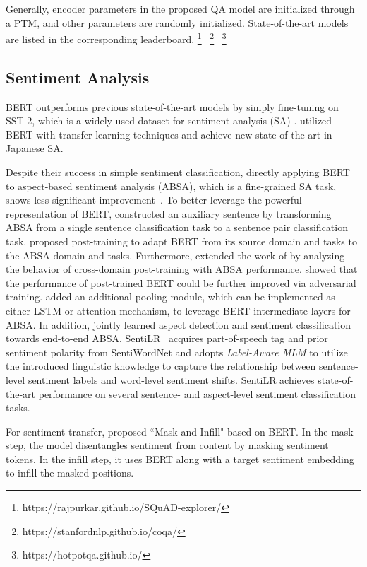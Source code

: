 \documentclass[fleqn]{SCYE-arxiv}
\begin{document}
\begin{multicols}{2}
Generally, encoder parameters in the proposed QA model are initialized through a PTM, and other parameters are randomly initialized. State-of-the-art models are listed in the corresponding leaderboard. \footnote{https://rajpurkar.github.io/SQuAD-explorer/}
~\footnote{https://stanfordnlp.github.io/coqa/}
~\footnote{https://hotpotqa.github.io/}


\subsection{Sentiment Analysis}

BERT outperforms previous state-of-the-art models by simply fine-tuning on SST-2, which is a widely used dataset for sentiment analysis (SA) \cite{devlin2019bert}. \citet{bataa2019investigation} utilized BERT with transfer learning techniques and achieve new state-of-the-art in Japanese SA.

Despite their success in simple sentiment classification, directly applying BERT to aspect-based sentiment analysis (ABSA), which is a fine-grained SA task, shows less significant improvement~\cite{sun2019utilizing}. To better leverage the powerful representation of BERT, \citet{sun2019utilizing} constructed an auxiliary sentence by transforming ABSA from a single sentence classification task to a sentence pair classification task. \citet{xu2019post} proposed post-training to adapt BERT from its source domain and tasks to the ABSA domain and tasks. Furthermore, \citet{rietzler2019adapt} extended the work of \cite{xu2019post} by analyzing the behavior of cross-domain post-training with ABSA performance. \citet{karimi2020adversarial} showed that the performance of post-trained BERT could be further improved via adversarial training. \citet{song2020utilizing} added an additional pooling module, which can be implemented as either LSTM or attention mechanism, to leverage BERT intermediate layers for ABSA. In addition, \citet{li2019exploiting} jointly learned aspect detection and sentiment classification towards end-to-end ABSA. SentiLR~\cite{ke2019sentilr} acquires part-of-speech tag and prior sentiment
polarity from SentiWordNet and adopts \textit{Label-Aware MLM} to utilize the
introduced linguistic knowledge to capture the
relationship between sentence-level sentiment
labels and word-level sentiment shifts. SentiLR achieves state-of-the-art performance on several sentence- and aspect-level sentiment classification tasks.

For sentiment transfer, \citet{wu2019mask} proposed ``Mask and Infill" based on BERT. In the mask step, the model disentangles sentiment from content by masking sentiment tokens. In the infill step, it uses BERT along with a target sentiment embedding to infill the masked positions.


\end{multicols}
\end{document}
